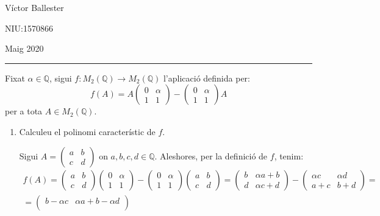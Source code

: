 \documentclass[11pt,a4paper]{article}
\begin{document}
\begin{flushright}
    Víctor Ballester\par NIU:1570866\par Maig 2020
\end{flushright}
\rule{180mm}{0.1mm}\par
Fixat $\alpha\in\mathbb{Q}$, sigui $f:M_2(\mathbb{Q})\rightarrow M_2(\mathbb{Q})$ l'aplicació definida per: 
$$f(A)=A\begin{pmatrix}
0 & \alpha\\
1 & 1
\end{pmatrix}-\begin{pmatrix}
0 & \alpha\\
1 & 1
\end{pmatrix}A$$ per a tota $A\in M_2(\mathbb{Q})$.
\begin{enumerate}
    \item Calculeu el polinomi característic de $f$.\par
    Sigui $A=\begin{pmatrix}
    a & b\\
    c & d
    \end{pmatrix}$ on $a,b,c,d\in\mathbb{Q}$. Aleshores, per la definició de $f$, tenim:
    \begin{multline*}
        f(A)=\begin{pmatrix}
    a & b\\
    c & d
    \end{pmatrix}\begin{pmatrix}
    0 & \alpha\\
    1 & 1
    \end{pmatrix}-\begin{pmatrix}
    0 & \alpha\\
    1 & 1
    \end{pmatrix}\begin{pmatrix}
    a & b\\
    c & d
    \end{pmatrix}=\begin{pmatrix}
    b & \alpha a+b\\
    d & \alpha c+d
    \end{pmatrix}-\begin{pmatrix}
    \alpha c & \alpha d\\
    a+c & b+d
    \end{pmatrix}=\\=\begin{pmatrix}
    b-\alpha c & \alpha a+b-\alpha d\\

\end{pmatrix}
\end{multline*}
\end{enumerate}
\end{document}
